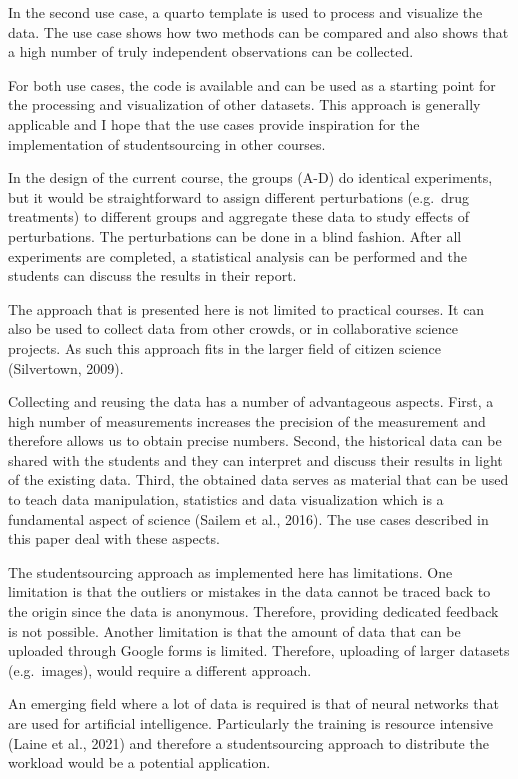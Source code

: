 \documentclass[
]{agujournal2019}
\begin{document}
In the second use case, a quarto template is used to process and
visualize the data. The use case shows how two methods can be compared
and also shows that a high number of truly independent observations can
be collected.

For both use cases, the code is available and can be used as a starting
point for the processing and visualization of other datasets. This
approach is generally applicable and I hope that the use cases provide
inspiration for the implementation of studentsourcing in other courses.

In the design of the current course, the groups (A-D) do identical
experiments, but it would be straightforward to assign different
perturbations (e.g.~drug treatments) to different groups and aggregate
these data to study effects of perturbations. The perturbations can be
done in a blind fashion. After all experiments are completed, a
statistical analysis can be performed and the students can discuss the
results in their report.

The approach that is presented here is not limited to practical courses.
It can also be used to collect data from other crowds, or in
collaborative science projects. As such this approach fits in the larger
field of citizen science (Silvertown, 2009).

Collecting and reusing the data has a number of advantageous aspects.
First, a high number of measurements increases the precision of the
measurement and therefore allows us to obtain precise numbers. Second,
the historical data can be shared with the students and they can
interpret and discuss their results in light of the existing data.
Third, the obtained data serves as material that can be used to teach
data manipulation, statistics and data visualization which is a
fundamental aspect of science (Sailem et al., 2016). The use cases
described in this paper deal with these aspects.

The studentsourcing approach as implemented here has limitations. One
limitation is that the outliers or mistakes in the data cannot be traced
back to the origin since the data is anonymous. Therefore, providing
dedicated feedback is not possible. Another limitation is that the
amount of data that can be uploaded through Google forms is limited.
Therefore, uploading of larger datasets (e.g.~images), would require a
different approach.

An emerging field where a lot of data is required is that of neural
networks that are used for artificial intelligence. Particularly the
training is resource intensive (Laine et al., 2021) and therefore a
studentsourcing approach to distribute the workload would be a potential
application.
\end{document}
